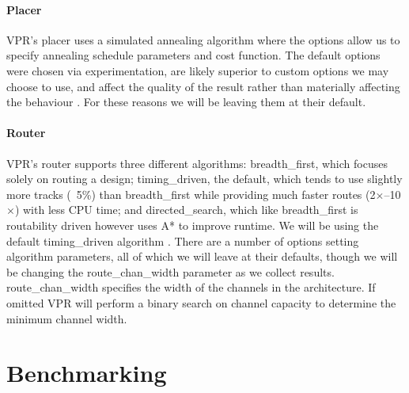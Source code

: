 \documentclass[12pt,final,oneside]{memoir} %
\begin{document}
\subsubsection{Placer}
\ac{VPR}'s placer uses a simulated annealing algorithm where the options allow us to specify annealing schedule parameters and cost function. The default options were chosen via experimentation, are likely superior to custom options we may choose to use, and affect the quality of the result rather than materially affecting the behaviour \cite{VPRManual, VPRBook}. For these reasons we will be leaving them at their default.
\subsubsection{Router}
\ac{VPR}'s router supports three different algorithms: breadth\_first, which focuses solely on routing a design; timing\_driven, the default, which tends to use slightly more tracks (~5\%) than breadth\_first while providing much faster routes (2$\times$--10$\times$) with less CPU time; and directed\_search, which like breadth\_first is routability driven however uses A* to improve runtime. We will be using the default timing\_driven algorithm .
There are a number of options setting algorithm parameters, all of which we will leave at their defaults, though we will be changing the route\_chan\_width parameter as we collect results. route\_chan\_width specifies the width of the channels in the architecture. If omitted \ac{VPR} will perform a binary search on channel capacity to determine the minimum channel width.

\chapter{Benchmarking}
\end{document}

